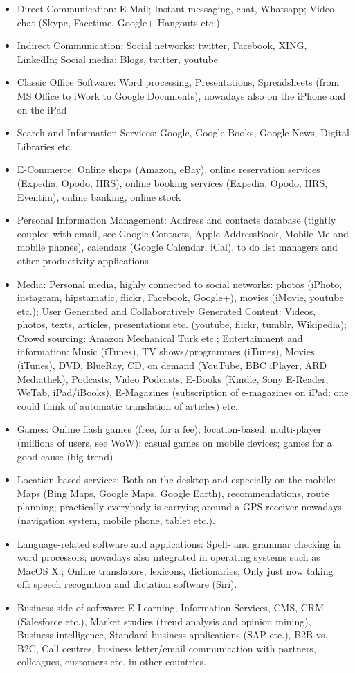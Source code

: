 \documentclass[10pt, plain]{../../metanetpaper}
\begin{document}
\begin{multicols}{2}
\begin{itemize}
\item Direct Communication: E-Mail; Instant messaging, chat, Whatsapp; Video chat (Skype, Facetime, Google+ Hangouts etc.)
\item Indirect Communication: Social networks: twitter, Facebook, XING, LinkedIn; Social media: Blogs, twitter, youtube
\item Classic Office Software: Word processing, Presentations, Spreadsheets (from MS Office to iWork to Google Documents), nowadays also on the iPhone and on the iPad
\item Search and Information Services: Google, Google Books, Google News, Digital Libraries etc.
\item E-Commerce: Online shops (Amazon, eBay), online reservation services (Expedia, Opodo, HRS), online booking services (Expedia, Opodo, HRS, Eventim), online banking, online stock
\item Personal Information Management: Address and contacts database (tightly coupled with email, see Google Contacts, Apple AddressBook, Mobile Me and mobile phones), calendars (Google Calendar, iCal), to do list managers and other productivity applications
\item Media: Personal media, highly connected to social networks: photos (iPhoto, instagram, hipstamatic, flickr, Facebook, Google+), movies (iMovie, youtube etc.); User Generated and Collaboratively Generated Content: Videos, photos, texts, articles, presentations etc. (youtube, flickr, tumblr, Wikipedia); Crowd sourcing: Amazon Mechanical Turk etc.; Entertainment and information: Music (iTunes), TV shows/programmes (iTunes), Movies (iTunes), DVD, BlueRay, CD, on demand (YouTube, BBC iPlayer, ARD Mediathek), Podcasts, Video Podcasts, E-Books (Kindle, Sony E-Reader, WeTab, iPad/iBooks), E-Magazines (subscription of e-magazines on iPad; one could think of automatic translation of articles) etc.
\item Games: Online flash games (free, for a fee); location-based; multi-player (millions of users, see WoW); casual games on mobile devices; games for a good cause (big trend)
\item Location-based services: Both on the desktop and especially on the mobile: Maps (Bing Maps, Google Maps, Google Earth), recommendations, route planning; practically everybody is carrying around a GPS receiver nowadays (navigation system, mobile phone, tablet etc.).
\item Language-related software and applications: Spell- and grammar checking in word processors; nowadays also integrated in operating systems such as MacOS X.; Online translators, lexicons, dictionaries; Only just now taking off: speech recognition and dictation software (Siri).
\item Business side of software: E-Learning, Information Services, CMS, CRM (Salesforce etc.), Market studies (trend analysis and opinion mining), Business intelligence, Standard business applications (SAP etc.), B2B vs. B2C, Call centres, business letter/email communication with partners, colleagues, customers etc. in other countries.
\end{itemize}


\end{multicols}
\end{document}
